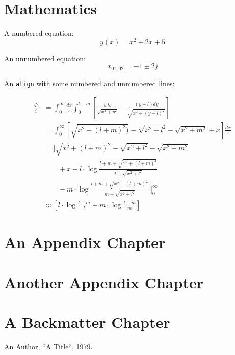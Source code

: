 \documentclass[a4paper,11pt,oneside,showtrims]{alpenthesis}
\begin{document}
\tikzset{external/export next=false}%
\begin{tcolorbox}
    \lipsum[2]
\end{tcolorbox}

\chapter{Mathematics}

A numbered equation:
\begin{equation}
    y(x) = x^2 + 2x + 5
\end{equation}

An unnumbered equation:
\begin{equation*}
    x_{01,02} = -1 \pm 2j
\end{equation*}

An \verb|align| with some numbered and unnumbered lines:

\begin{align}
    \frac{\Phi}{i}
    & =
    \int_{0}^{\infty} \frac{dx}{x} \int_{0}^{l+m}
    \left[
        \frac{y dy}{\sqrt{x^2+y^2}} - \frac{(y-l) dy}{\sqrt{x^2+(y-l)^2}}
    \right]
    \nonumber
    \\
    &=
    \int_{0}^{\infty}
    \left[
        \sqrt{x^2 + (l+m)^2)} - \sqrt{x^2+l^2} - \sqrt{x^2+m^2}+x
    \right]
    \frac{dx}{x}
    \nonumber
    \\
    &=
    \Bigg[
        \sqrt{x^2 + (l+m)^2} - \sqrt{x^2+l^2} - \sqrt{x^2+m^2}
        \nonumber
        \\
        & ~~~~~~~~~   + x - l \cdot \log{\frac{l+m+\sqrt{x^2+(l+m)^2}}{l+\sqrt{x^2+l^2}}}
        \nonumber
        \\
        & ~~~~~~~~~   - m \cdot \log{\frac{l+m+\sqrt{x^2+(l+m)^2}}{m+\sqrt{x^2+l^2}}} ~
    \Bigg]_0^{\infty}
    \label{eq:mISL:2}
    \\
    & \approx
    \left[ l \cdot \log{\frac{l+m}{l}} + m \cdot \log{\frac{l+m}{m}} \right]
    \label{eq:mISL:3}
\end{align}

\cleardoublepage
\begin{titlingpage*}
    \begin{vplace}
        \flushright\Huge\bfseries\sffamily\appendixpagename
    \end{vplace}
\end{titlingpage*}
\appendix
{}
\chapter{An Appendix Chapter}
\lipsum[1-3]

\chapter{Another Appendix Chapter}
\lipsum[4-6]

\backmatter
\chapter{A Backmatter Chapter}
\lipsum[7-9]

\begin{thebibliography}{1}
        An Author, ``A Title``, 1979.
\end{thebibliography}
\end{document}

